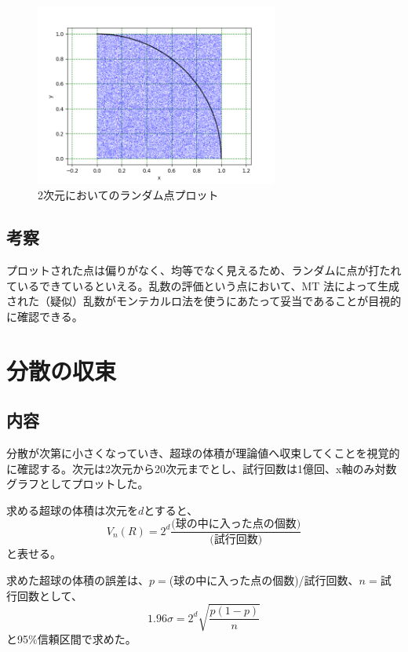 \documentclass[a4paper,twoside]{jarticle}
\begin{document}
\begin{figure}[ht]
\begin{center}
\includegraphics[width=8cm]{../python/report1_monte_carlo/out/plot2d.png}
\end{center}
\caption{2次元においてのランダム点プロット}
\label{fig:2d}
\end{figure}

\subsection{考察}
プロットされた点は偏りがなく、均等でなく見えるため、ランダムに点が打たれているできているといえる。乱数の評価という点において、MT 法によって生成された（疑似）乱数がモンテカルロ法を使うにあたって妥当であることが目視的に確認できる。

\section{分散の収束}\label{s-variance}
\subsection{内容}
分散が次第に小さくなっていき、超球の体積が理論値へ収束してくことを視覚的に確認する。次元は2次元から20次元までとし、試行回数は1億回、x軸のみ対数グラフとしてプロットした。

求める超球の体積は次元を$d$とすると、
\begin{equation}
  V_n(R)=2^d\frac{\textrm{(球の中に入った点の個数)}}{\textrm{(試行回数)}}
\end{equation}
と表せる。

求めた超球の体積の誤差は、$p=$(球の中に入った点の個数)/試行回数、$n=$試行回数として、
\begin{equation}
1.96\sigma=2^d\sqrt{\frac{p\left(1-p\right)}{n}}
\end{equation}
と95\%信頼区間で求めた。
\end{document}
